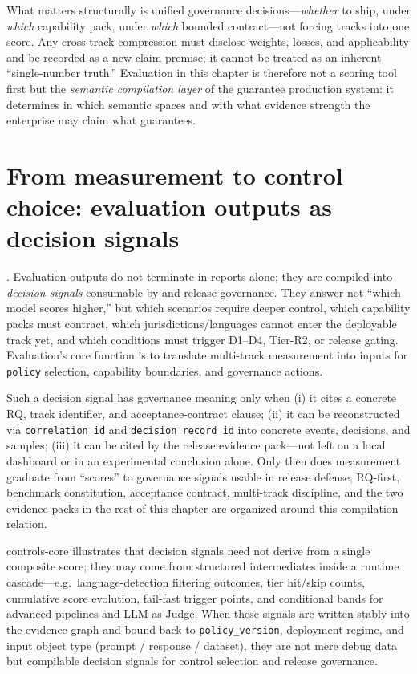\documentclass[11pt,a4paper]{report}
\begin{document}
What matters structurally is unified governance decisions—\emph{whether} to ship, under \emph{which} capability pack, under \emph{which} bounded contract—not forcing tracks into one score. Any cross-track compression must disclose weights, losses, and applicability and be recorded as a new claim premise; it cannot be treated as an inherent “single-number truth.” Evaluation in this chapter is therefore not a scoring tool first but the \emph{semantic compilation layer} of the guarantee production system: it determines in which semantic spaces and with what evidence strength the enterprise may claim what guarantees.

\section{From measurement to control choice: evaluation outputs as decision signals}
\EvalFramework{}. Evaluation outputs do not terminate in reports alone; they are compiled into \emph{decision signals} consumable by \ControlPlane{} and release governance. They answer not “which model scores higher,” but which scenarios require deeper control, which capability packs must contract, which jurisdictions/languages cannot enter the deployable track yet, and which conditions must trigger D1--D4, Tier-R2, or release gating. Evaluation’s core function is to translate multi-track measurement into inputs for \texttt{policy} selection, capability boundaries, and governance actions.

Such a decision signal has governance meaning only when (i) it cites a concrete RQ, track identifier, and acceptance-contract clause; (ii) it can be reconstructed via \texttt{correlation\_id} and \texttt{decision\_record\_id} into concrete events, decisions, and samples; (iii) it can be cited by the release evidence pack—not left on a local dashboard or in an experimental conclusion alone. Only then does measurement graduate from “scores” to governance signals usable in release defense; RQ-first, benchmark constitution, acceptance contract, multi-track discipline, and the two evidence packs in the rest of this chapter are organized around this compilation relation.

controls-core illustrates that decision signals need not derive from a single composite score; they may come from structured intermediates inside a runtime cascade—e.g.\ language-detection filtering outcomes, tier hit/skip counts, cumulative score evolution, fail-fast trigger points, and conditional bands for advanced pipelines and LLM-as-Judge. When these signals are written stably into the evidence graph and bound back to \texttt{policy\_version}, deployment regime, and input object type (prompt / response / dataset), they are not mere debug data but compilable decision signals for control selection and release governance.
\end{document}
